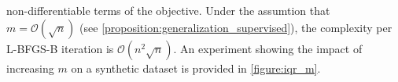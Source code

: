non-differentiable terms of the objective. Under the assumtion that
$m=\mathcal{O}(\sqrt{n})$ (see \cref{proposition:generalization_supervised}),
the complexity per \ac{L-BFGS-B} iteration is $\mathcal{O}(n^2\sqrt{n})$.
An experiment showing the impact of increasing $m$ on a synthetic dataset is
provided in \cref{figure:iqr_m}.
\par
%

